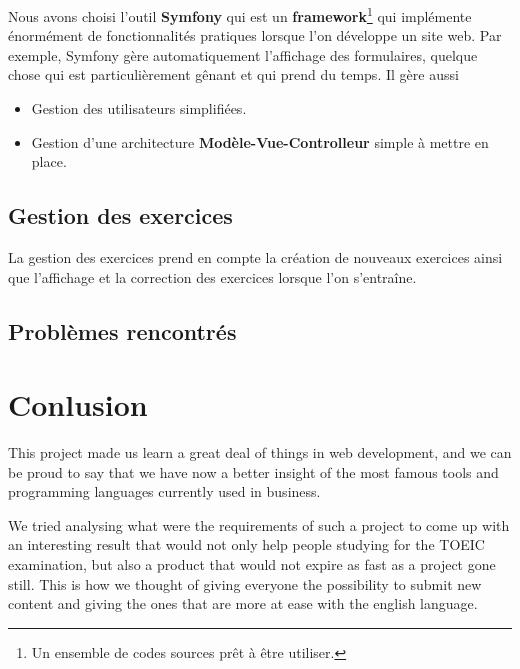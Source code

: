 \documentclass[12pt,a4paper]{report}
\begin{document}
Nous avons choisi l'outil \textbf{Symfony}\cite{Symfony} qui est un
\textbf{framework}\footnote{Un ensemble de codes sources pr\^et à \^etre utiliser.} qui implémente énormément de fonctionnalités pratiques
lorsque l'on développe un site web. Par exemple, Symfony gère automatiquement
l'affichage des formulaires, quelque chose qui est particulièrement g\^enant et
qui prend du temps. Il gère aussi 

\begin{itemize}
	\item Gestion des utilisateurs simplifiées.
	\item Gestion d'une architecture \textbf{Modèle-Vue-Controlleur} simple à
	mettre en place.
\end{itemize}


\subsection{Gestion des exercices}
La gestion des exercices prend en compte la création de nouveaux exercices ainsi que l'affichage et la correction des exercices lorsque l'on s'entraîne.



\subsection{Problèmes rencontrés}


\section*{Conlusion}
This project made us learn a great deal of things in web development, and we
can be proud to say that we have now a better insight of the most famous tools
and programming languages currently used in business.
 
We tried analysing what were the requirements of such a project to come up with
an interesting result that would not only help people studying for the TOEIC
examination, but also a product that would not expire as fast as a project gone
still. This is how we thought of giving everyone the possibility to submit new
content and giving the ones that are more at ease with the english language.


\end{document}
